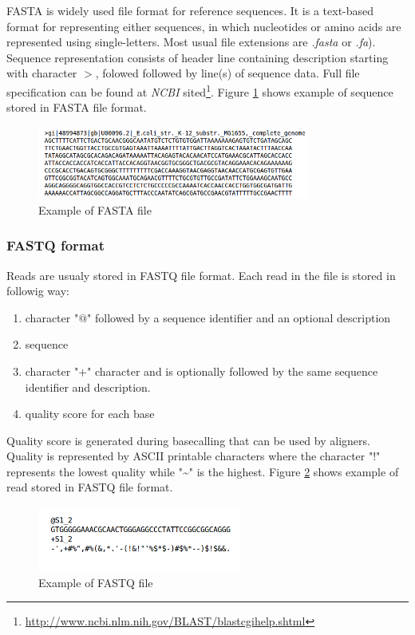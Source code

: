 \documentclass[times, utf8, diplomski, numeric, english]{fer}
\begin{document}
FASTA is widely used file format for reference sequences. It is a text-based format for representing either sequences, in which nucleotides or amino acids are represented using single-letters. Most usual file extensions are \textit{.fasta} or \textit{.fa}).
Sequence representation consists of header line containing description starting with character $ > $, folowed followed by line(s) of sequence data. Full file specification can be found at \textit{NCBI} sited\footnote{\url{http://www.ncbi.nlm.nih.gov/BLAST/blastcgihelp.shtml}}.
 Figure \ref{fg:fsta} shows example of sequence stored in FASTA file format.
\begin{figure}[!ht]
	\begin{center}
		\includegraphics[width=0.8\textwidth]{./imgs/fasta.png}
		\caption{Example of FASTA file}
		\label{fg:fsta}
	\end{center}
\end{figure} 

\subsubsection{FASTQ format}
Reads are usualy stored in FASTQ file format. Each read in the file is stored in followig way:
\begin{enumerate}
	\item character "$@$" followed  by a sequence identifier and an optional description 
	\item sequence
	\item character "$+$" character and is optionally followed by the same sequence identifier and description.
	\item quality score for each base
\end{enumerate}
Quality score is generated during basecalling that can be used by aligners. Quality is represented by ASCII printable characters where
the character "$!$" represents the lowest quality while "\textasciitilde" is the highest. Figure \ref{fg:fq} shows example of read stored in FASTQ file format.
\begin{figure}[!ht]
	\begin{center}
		\includegraphics[width=0.6\textwidth]{./imgs/fq.png}
		\caption{Example of FASTQ file}
		\label{fg:fq}
	\end{center}
\end{figure} 
\end{document}

